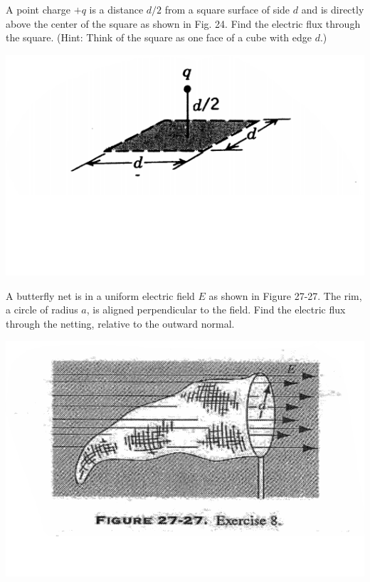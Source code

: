 \documentclass[12pt,letterpaper,boxed,cm]{hmcpset}
\begin{document}

\begin{problem}[27-E7]
A point charge $+q$ is a distance $d/2$ from a square surface of side $d$ and is directly above the center of the square as shown in Fig. 24. Find the electric flux through the square. (Hint: Think of the square as one face of a cube with edge $d$.)
\begin{center}
	\includegraphics[scale=0.7]{01.png}
\end{center}
\end{problem}
\begin{solution}
\end{solution}
\newpage

\begin{problem}[27-E8]
	A butterfly net is in a uniform electric field $E$ as shown in Figure 27-27. The rim, a circle of radius $a$, is aligned perpendicular to the field. Find the electric flux through the netting, relative to the outward normal.
\begin{center}
	\includegraphics[scale=0.7]{02.png}
\end{center}
\end{problem}
\begin{solution}
\end{solution}
\end{document}
